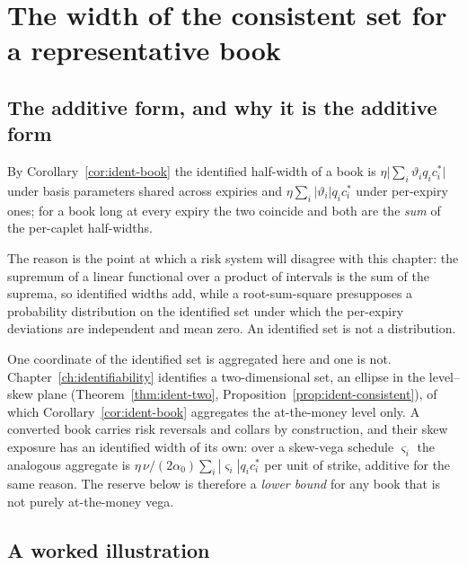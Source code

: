 \documentclass[../../../main.tex]{subfiles}
\begin{document}

\section{The width of the consistent set for a representative book}\label{sec:zar-width}

\subsection{The additive form, and why it is the additive form}

By Corollary~\ref{cor:ident-book} the identified half-width of a book is $\eta\big|\sum_i\vartheta_iq_ic^*_i\big|$ under basis parameters shared across expiries and $\eta\sum_i|\vartheta_i|q_ic^*_i$ under per-expiry ones; for a book long at every expiry the two coincide and both are the \emph{sum} of the per-caplet half-widths.

The reason is the point at which a risk system will disagree with this chapter: the supremum of a linear functional over a product of intervals is the sum of the suprema, so identified widths add, while a root-sum-square presupposes a probability distribution on the identified set under which the per-expiry deviations are independent and mean zero. An identified set is not a distribution.

One coordinate of the identified set is aggregated here and one is not. Chapter~\ref{ch:identifiability} identifies a two-dimensional set, an ellipse in the level--skew plane (Theorem~\ref{thm:ident-two}, Proposition~\ref{prop:ident-consistent}), of which Corollary~\ref{cor:ident-book} aggregates the at-the-money level only. A converted book carries risk reversals and collars by construction, and their skew exposure has an identified width of its own: over a skew-vega schedule $\varsigma_i$ the analogous aggregate is $\eta\,\nu/(2\alpha_0)\sum_i|\varsigma_i|q_ic^*_i$ per unit of strike, additive for the same reason. The reserve below is therefore a \emph{lower bound} for any book that is not purely at-the-money vega.

\subsection{A worked illustration}
\end{document}
